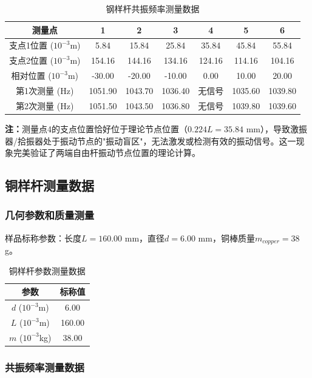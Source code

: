 ﻿\documentclass[12pt,a4paper]{article}
\begin{document}
\begin{table}[H]
\centering
\caption{钢样杆共振频率测量数据}
\begin{tabular}{|c|c|c|c|c|c|c|}
\hline
测量点 & 1 & 2 & 3 & 4 & 5 & 6 \\
\hline
支点1位置 ($10^{-3}$m) & 5.84 & 15.84 & 25.84 & 35.84 & 45.84 & 55.84 \\
\hline
支点2位置 ($10^{-3}$m) & 154.16 & 144.16 & 134.16 & 124.16 & 114.16 & 104.16 \\
\hline
相对位置 ($10^{-3}$m) & -30.00 & -20.00 & -10.00 & 0.00 & 10.00 & 20.00 \\
\hline
第1次测量 (Hz) & 1051.90 & 1043.70 & 1036.40 & 无信号 & 1035.60 & 1039.80 \\
\hline
第2次测量 (Hz) & 1051.50 & 1043.50 & 1036.80 & 无信号 & 1039.80 & 1039.60 \\
\hline
\end{tabular}
\end{table}

\textbf{注：}测量点4的支点位置恰好位于理论节点位置（$0.224L = 35.84$ mm），导致激振器/拾振器处于振动节点的"振动盲区"，无法激发或检测有效的振动信号。这一现象完美验证了两端自由杆振动节点位置的理论计算。

\subsection{铜样杆测量数据}

\subsubsection{几何参数和质量测量}

样品标称参数：长度$L = 160.00$ mm，直径$d = 6.00$ mm，铜棒质量$m_{copper} = 38$ g。

\begin{table}[H]
\centering
\caption{铜样杆参数测量数据}
\begin{tabular}{|c|c|}
\hline
参数 & 标称值 \\
\hline
$d$ ($10^{-3}$m) & 6.00 \\
\hline
$L$ ($10^{-3}$m) & 160.00 \\
\hline
$m$ ($10^{-3}$kg) & 38.00 \\
\hline
\end{tabular}
\end{table}

\subsubsection{共振频率测量数据}
\end{document}
